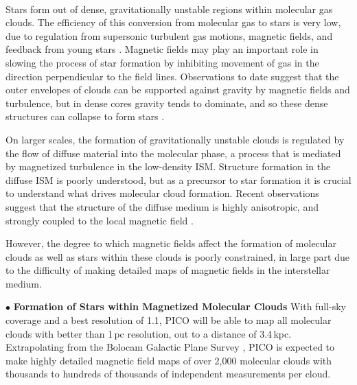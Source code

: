 \documentclass[PICOReport.tex]{subfiles}
\begin{document}
\vspace{0.1in}
 \\
Stars form out of dense, gravitationally unstable regions within molecular gas clouds. The efficiency of this conversion from molecular gas to stars is very low, due to regulation from supersonic turbulent gas motions, magnetic fields, and feedback from young stars \citep{McKee2007}. 
Magnetic fields may play an important role in slowing the process of star formation by inhibiting movement of gas in the direction perpendicular to the field lines.  Observations to date suggest that the outer envelopes of clouds can be supported against gravity by magnetic fields and turbulence, but in dense cores gravity tends to dominate, and so these dense structures can collapse to form stars \citep{Crutcher2010}.

On larger scales, the formation of gravitationally unstable clouds is regulated by the flow of diffuse material into the molecular phase, a process that is mediated by magnetized turbulence in the low-density ISM. Structure formation in the diffuse ISM is poorly understood, but as a precursor to star formation it is crucial to understand what drives molecular cloud formation. Recent observations suggest that the structure of the diffuse medium is highly anisotropic, and strongly coupled to the local magnetic field \citep{Clark:2014, Clark:2015, Kalberla:2016, KalberlaKerp:2016}.

However, the degree to which magnetic fields affect the formation of molecular clouds as well as stars within these clouds is poorly constrained, in large part due to the difficulty of making detailed maps of magnetic fields in the interstellar medium.

\noindent$\bullet$ {\bf Formation of Stars within Magnetized Molecular Clouds} \hspace{0.1in}
With full-sky coverage and a best resolution of 1.1\arcmin, PICO will be able to map all molecular clouds with better than 1\,pc resolution, out to a distance of 3.4\,kpc.  Extrapolating from the Bolocam Galactic Plane Survey \citep[BGPS,][]{EllsworthBowers2015}, PICO is expected 
to make highly detailed magnetic field maps of over 2,000 molecular clouds with thousands to hundreds of thousands of independent measurements per cloud. 
\end{document}
